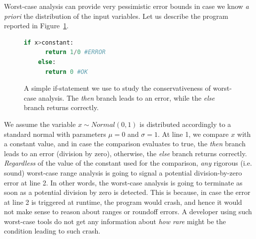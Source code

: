 Worst-case analysis can provide very pessimistic error bounds in case we know \emph{a priori} the distribution of the input variables. 
%
%
Let us describe the program reported in Figure~\ref{fig:prob}.
%
\begin{figure}[tb!]
	\begin{lstlisting}[frame=single, language=Python]
	if x>constant:
	  return 1/0 #ERROR
	else:
	  return 0 #OK
	\end{lstlisting}
	\caption{A simple if-statement we use to study the conservativeness of worst-case analysis. The \emph{then} branch leads to an error, while the \emph{else} branch returns correctly.}
	\label{fig:prob}
\end{figure}
%
We assume the variable $x\sim Normal(0,1)$ is distributed accordingly to a standard normal with parameters $\mu = 0$ and $\sigma = 1$.
%
At line 1, we compare $x$ with a constant value, and in case the comparison evaluates to true, the \emph{then} branch leads to an error (division by zero), otherwise, the \emph{else} branch returns correctly.
%
\emph{Regardless} of the value of the constant used for the comparison, \emph{any} rigorous (i.e. sound) worst-case range analysis is going to signal a potential division-by-zero error at line 2.
%
In other words, the worst-case analysis is going to terminate as soon as a potential division by zero is detected.
%
This is because, in case the error at line 2 is triggered at runtime, the program would crash, and hence it would not make sense to reason about ranges or roundoff errors.
%
A developer using such worst-case tools do not get any information about \emph{how rare} might be the condition leading to such crash.
%

